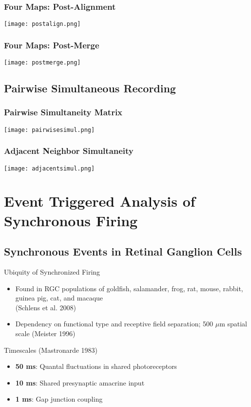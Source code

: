 \documentclass{beamer}
\begin{document}
\frame
{
	\frametitle{Four Maps: Post-Alignment}
	\begin{center}
	\texttt{[image: postalign.png]}
	\end{center}
}

\frame
{
	\frametitle{Four Maps: Post-Merge}
	\begin{center}
	\texttt{[image: postmerge.png]}
	\end{center}
}

\subsection{Pairwise Simultaneous Recording}
\frame
{
	\frametitle{Pairwise Simultaneity Matrix}
	\begin{center}
	\texttt{[image: pairwisesimul.png]}
	\end{center}
}

\frame
{
	\frametitle{Adjacent Neighbor Simultaneity}
	\begin{center}
	\texttt{[image: adjacentsimul.png]}
	\end{center}
}

\section{Event Triggered Analysis of Synchronous Firing}
\subsection{Synchronous Events in Retinal Ganglion Cells}
\frame
{
\begin{block}{Ubiquity of Synchronized Firing}
\begin{itemize}
	\item Found in RGC populations of goldfish, salamander, frog, rat, mouse, rabbit, guinea pig, cat, and macaque \\(Schlens et al. 2008)
	\item Dependency on functional type and receptive field separation; 500 $\mu$m spatial scale (Meister 1996)
	\end{itemize}
\end{block}
\begin{block}{Timescales (Mastronarde 1983)}
\begin{itemize}
	\item \textbf{50 ms}: Quantal fluctuations in shared photoreceptors
	\item \textbf{10 ms}: Shared presynaptic amacrine input
	\item \textbf{1 ms}: Gap junction coupling
\end{itemize}
\end{block}
}
\end{document}
